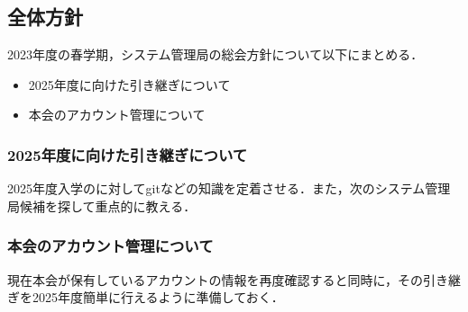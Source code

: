 \subsection*{全体方針}


2023年度の春学期，システム管理局の総会方針について以下にまとめる．
\begin{itemize}
    \item 2025年度に向けた引き継ぎについて
    \item 本会のアカウント管理について
\end{itemize}

\subsubsection*{2025年度に向けた引き継ぎについて}
2025年度入学の\firstGrade{}に対してgitなどの知識を定着させる．また，次のシステム管理局候補を探して重点的に教える．

\subsubsection*{本会のアカウント管理について}
現在本会が保有しているアカウントの情報を再度確認すると同時に，その引き継ぎを2025年度簡単に行えるように準備しておく．
